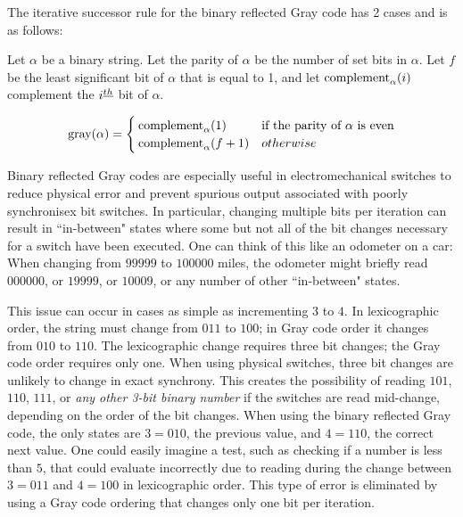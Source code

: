 The iterative successor rule for the binary reflected Gray code has 2 cases and is as follows:


Let $\alpha$ be a binary string.  Let the parity of $\alpha$ be the number of set bits in $\alpha$.  Let $f$ be the least significant bit of $\alpha$ that is equal to 1, and let $\complementbit[\alpha]{i}$ complement the $i\thh$ bit of $\alpha$.  

\begin{equation} \label{eq:BRGC-rule}
    \text{gray}(\alpha) = \begin{cases} 
        \complementbit[\alpha]{1} & \text{if the parity of $\alpha$ is even}\\
        \complementbit[\alpha]{f+1} & otherwise\\
\end{cases}
\end{equation}

Binary reflected Gray codes are especially useful in electromechanical switches to reduce physical error and prevent spurious output associated with poorly synchronisex bit switches.  In particular, changing multiple bits per iteration can result in ``in-between" states where some but not all of the bit changes necessary for a switch have been executed.  One can think of this like an odometer on a car: When changing from $99999$ to $100000$ miles, the odometer might briefly read $000000$, or $19999$, or $10009$, or any number of other ``in-between" states. 

This issue can occur in cases as simple as incrementing $3$ to $4$.  In lexicographic order, the string must change from $011$ to $100$; in Gray code order it changes from $010$ to $110$.  The lexicographic change requires three bit changes; the Gray code order requires only one.  When using physical switches, three bit changes are unlikely to change in exact synchrony.  This creates the possibility of reading $101$, $110$, $111$, or \emph{any other 3-bit binary number} if the switches are read mid-change, depending on the order of the bit changes.  When using the binary reflected Gray code, the only states are $3=010$, the previous value, and $4=110$, the correct next value. One could easily imagine a test, such as checking if a number is less than $5$, that could evaluate incorrectly due to reading during the change between $3=011$ and $4=100$ in lexicographic order.  This type of error is eliminated by using a Gray code ordering that changes only one bit per iteration.


